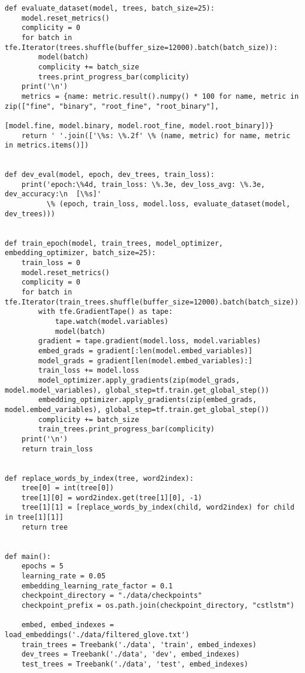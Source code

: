 \begin{lstlisting}[style=app]
def evaluate_dataset(model, trees, batch_size=25):
    model.reset_metrics()
    complicity = 0
    for batch in tfe.Iterator(trees.shuffle(buffer_size=12000).batch(batch_size)):
        model(batch)
        complicity += batch_size
        trees.print_progress_bar(complicity)
    print('\n')
    metrics = {name: metric.result().numpy() * 100 for name, metric in zip(["fine", "binary", "root_fine", "root_binary"],
                                                                           [model.fine, model.binary, model.root_fine, model.root_binary])}
    return ' '.join(['\%s: \%.2f' \% (name, metric) for name, metric in metrics.items()])


def dev_eval(model, epoch, dev_trees, train_loss):
    print('epoch:\%4d, train_loss: \%.3e, dev_loss_avg: \%.3e, dev_accuracy:\n  [\%s]'
          \% (epoch, train_loss, model.loss, evaluate_dataset(model, dev_trees)))


def train_epoch(model, train_trees, model_optimizer, embedding_optimizer, batch_size=25):
    train_loss = 0
    model.reset_metrics()
    complicity = 0
    for batch in tfe.Iterator(train_trees.shuffle(buffer_size=12000).batch(batch_size)):
        with tfe.GradientTape() as tape:
            tape.watch(model.variables)
            model(batch)
        gradient = tape.gradient(model.loss, model.variables)
        embed_grads = gradient[:len(model.embed_variables)]
        model_grads = gradient[len(model.embed_variables):]
        train_loss += model.loss
        model_optimizer.apply_gradients(zip(model_grads, model.model_variables), global_step=tf.train.get_global_step())
        embedding_optimizer.apply_gradients(zip(embed_grads, model.embed_variables), global_step=tf.train.get_global_step())
        complicity += batch_size
        train_trees.print_progress_bar(complicity)
    print('\n')
    return train_loss


def replace_words_by_index(tree, word2index):
    tree[0] = int(tree[0])
    tree[1][0] = word2index.get(tree[1][0], -1)
    tree[1][1] = [replace_words_by_index(child, word2index) for child in tree[1][1]]
    return tree


def main():
    epochs = 5
    learning_rate = 0.05
    embedding_learning_rate_factor = 0.1
    checkpoint_directory = "./data/checkpoints"
    checkpoint_prefix = os.path.join(checkpoint_directory, "cstlstm")

    embed, embed_indexes = load_embeddings('./data/filtered_glove.txt')
    train_trees = Treebank('./data', 'train', embed_indexes)
    dev_trees = Treebank('./data', 'dev', embed_indexes)
    test_trees = Treebank('./data', 'test', embed_indexes)


\end{lstlisting}

